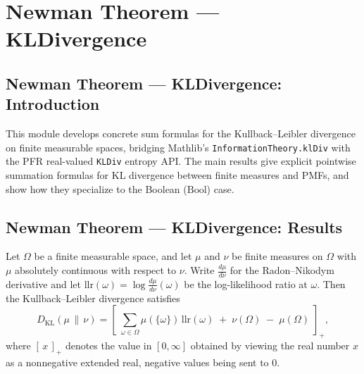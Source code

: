 \section{Newman Theorem --- KLDivergence}
\subsection*{Newman Theorem --- KLDivergence: Introduction}

This module develops concrete sum formulas for the Kullback--Leibler divergence on finite
measurable spaces, bridging Mathlib's \texttt{InformationTheory.klDiv} with the PFR
real-valued \texttt{KLDiv} entropy API.  The main results give explicit pointwise
summation formulas for KL divergence between finite measures and PMFs, and show how they
specialize to the Boolean ($\mathrm{Bool}$) case.

\subsection*{Newman Theorem --- KLDivergence: Results}

\begin{theorem}
\label{CommunicationComplexity.klDiv_eq_sum_llr_of_ac}
\leanok
{}
Let $\Omega$ be a finite measurable space, and let $\mu$ and $\nu$ be finite measures on
$\Omega$ with $\mu$ absolutely continuous with respect to $\nu$. Write
$\tfrac{d\mu}{d\nu}$ for the Radon–Nikodym derivative and let $\mathrm{llr}(\omega) =
\log \tfrac{d\mu}{d\nu}(\omega)$ be the log-likelihood ratio at $\omega$. Then the
Kullback–Leibler divergence satisfies
\[
  D_{\mathrm{KL}}(\mu \,\|\, \nu)
= \left[\; \sum_{\omega \in \Omega} \mu(\{\omega\})\,\mathrm{llr}(\omega) \;+\;
\nu(\Omega) \;-\; \mu(\Omega) \;\right]_{+},
\]
where $[\,x\,]_{+}$ denotes the value in $[0,\infty]$ obtained by viewing the real
number $x$ as a nonnegative extended real, negative values being sent to $0$.
\end{theorem}

